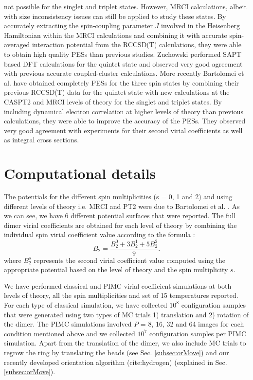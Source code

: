 not possible for the singlet and triplet states. However, MRCI calculations, albeit with size inconsistency issues can still be applied to study these states. By accurately extracting the spin-coupling parameter $J$ involved in the Heisenberg Hamiltonian within the MRCI calculations and combining it with accurate spin-averaged interaction potential from the RCCSD(T) calculations, they were able to obtain high quality PESs than previous studies. Zuchowski \cite{Zuchowski2008} performed SAPT based DFT calculations for the quintet state and observed very good agreement with previous accurate \abInitio{} coupled-cluster calculations. More recently Bartolomei et al. \cite{Bartolomei2010} have obtained completely \abInitio{} PESs for the three spin states by combining their previous RCCSD(T) data \cite{Bartolomei2008} for the quintet state with new \abInitio{} calculations at the CASPT2 and MRCI levels of theory for the singlet and triplet states. By including dynamical electron correlation at higher levels of theory than previous calculations, they were able to improve the accuracy of the PESs. They observed very good agreement with experiments for their second virial coefficients as well as integral cross sections.
\section{Computational details}
    The \abInitio{} potentials for the different spin multiplicities (s = 0, 1 and 2) and using different levels of theory i.e. MRCI and PT2 were due to Bartolomei et al. \cite{Bartolomei2010}. As we can see, we have 6 different potential surfaces that were reported. The full dimer virial coefficients are obtained for each level of theory by combining the individual spin virial coefficient value according to the formula \cite{Aquilanti1999,Bartolomei2010}:
    \begin{equation}
        B_2 = \frac{B_2^0 + 3 B_2^1 + 5 B_2^2}{9}.
    \end{equation}
    where $B_2^s$ represents the second virial coefficient value computed using the appropriate potential based on the level of theory and the spin multiplicity $s$.

    We have performed classical and PIMC virial coefficient simulations at both levels of theory, all the spin multiplicities and set of 15 temperatures reported. For each type of classical simulation, we have collected $10^8$ configuration samples that were generated using two types of MC trials 1) translation and 2) rotation of the dimer. The PIMC simulations involved $P$ = 8, 16, 32 and 64 images for each condition mentioned above and we collected $10^7$ configuration samples per PIMC simulation. Apart from the translation of the dimer, we also include MC trials to regrow the ring by translating the beads (see Sec. \ref{subsec:orMove}) and our recently developed orientation algorithm (cite:hydrogen) (explained in Sec. \ref{subsec:orMove}).

